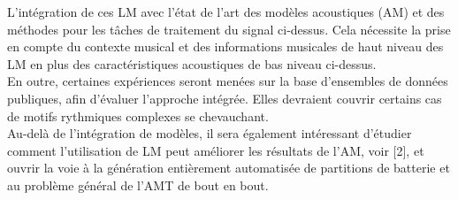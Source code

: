 L'intégration de ces LM avec l'état de l'art des modèles acoustiques (AM) et des méthodes pour les tâches de traitement du signal ci-dessus. Cela nécessite la prise en compte du contexte musical et des informations musicales de haut niveau des LM en plus des caractéristiques acoustiques de bas niveau ci-dessus.\\
En outre, certaines expériences seront menées sur la base d'ensembles de données publiques, afin d'évaluer l'approche intégrée. Elles devraient couvrir certains cas de motifs rythmiques complexes se chevauchant.\\

Au-delà de l'intégration de modèles, il sera également intéressant d'étudier comment l'utilisation de LM peut améliorer les résultats de l'AM, voir [2], et ouvrir la voie à la génération entièrement automatisée de partitions de batterie et au problème général de l'AMT de bout en bout.
\cite{8350302}